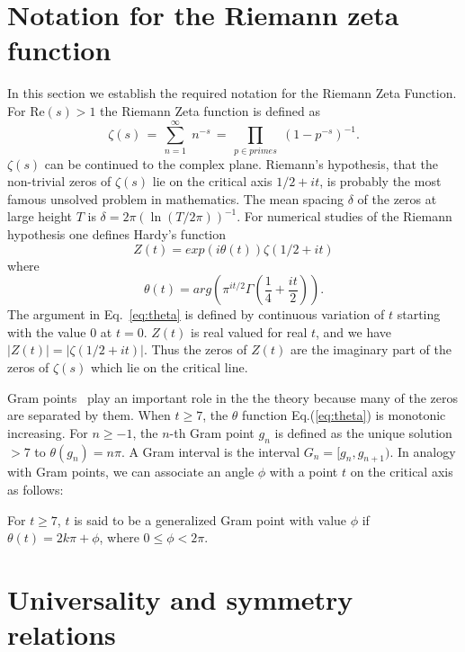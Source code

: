 \documentclass[twoside]{article}
\begin{document}
\section{\label{sec2}Notation for the Riemann zeta function}

In this section we  establish the required notation for the 
Riemann Zeta Function. 
For $\mathrm{Re} (s) > 1$ the Riemann Zeta function is defined as
\begin{equation}
\zeta ( s ) \, = \, \sum^{\infty}_{n = 1} \; n^{-s} \, = \, \prod_{p \in primes} \;
\left( 1 - p^{-s} \right)^{-1}.
\label{eqRie}
\end{equation}
 $\zeta ( s )$ can be continued to
the complex plane. Riemann's hypothesis, that the non-trivial zeros of $\zeta ( s )$ lie on the 
critical axis $1/2+it$, is probably the most famous unsolved problem in mathematics.
The mean spacing $\delta$ of the zeros  at large height $T$ is $\delta = 2\pi(\ln (T/2\pi))^{-1}$. 
For numerical studies of the Riemann hypothesis one defines Hardy's function
\begin{equation}
Z(t)=exp(i\theta(t))\zeta(1/2 +it) 
\label{eq:hardy}
\end{equation}
where 
\begin{equation}
\theta(t) = arg (\pi^{it/2} \Gamma(\frac{1}{4} + \frac{it}{2})). 
\label{eq:theta}
\end{equation}
The argument in Eq.~\ref{eq:theta} is defined by continuous variation of $t$ starting with the value $0$ at $t = 0$.
$Z(t)$ is real valued for real $t$,
and we have $|Z(t)| = |\zeta(1/2+it)|$. Thus the zeros of $Z(t)$ are the imaginary part of the zeros 
of $\zeta(s)$ which lie on the critical line.  

Gram points~\cite{Gram 1903} play an important role in the the theory because many of the zeros are separated by them.  When $t \ge 7$, the $\theta$ function Eq.(\ref{eq:theta}) is monotonic increasing. 
For $n \ge -1$, the $n$-th Gram point $g_n$ is defined as the unique solution $> 7$ to
$\theta (g_n) = n\pi$. A Gram interval is the interval $G_n = [g_n,g_{n+1})$.
 In analogy with Gram points, we can associate an angle $\phi$ with a point $t$ on the critical axis as follows:
\begin{definition}\label{phi}
For $t \ge 7$, $t$ is said to be a generalized Gram point with value $\phi$  if
$\theta (t) = 2k\pi + \phi$, where $0 \le \phi < 2\pi$.
\end{definition}



\section{\label{sec3}Universality and symmetry relations}
\end{document}
